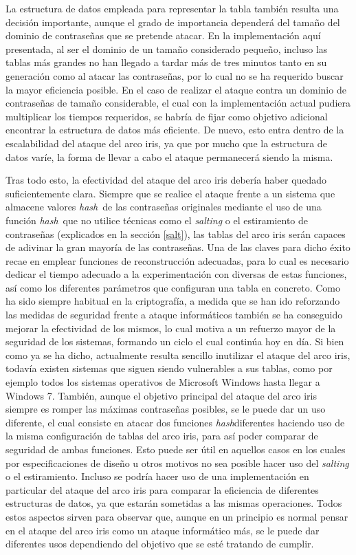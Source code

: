 \documentclass[12pt,spanish,listoffigures,listoftables]{tfgetsinf}
\newcommand{\hash}{\textit{hash}}
\begin{document}
La estructura de datos empleada para representar la tabla también resulta una decisión importante, aunque el grado de importancia dependerá del tamaño del dominio de contraseñas que se pretende atacar. En la implementación aquí presentada, al ser el dominio de un tamaño considerado pequeño, incluso las tablas más grandes no han llegado a tardar más de tres minutos tanto en su generación como al atacar las contraseñas, por lo cual no se ha requerido buscar la mayor eficiencia posible. En el caso de realizar el ataque contra un dominio de contraseñas de tamaño considerable, el cual con la implementación actual pudiera multiplicar los tiempos requeridos, se habría de fijar como objetivo adicional encontrar la estructura de datos más eficiente. De nuevo, esto entra dentro de la escalabilidad del ataque del arco iris, ya que por mucho que la estructura de datos varíe, la forma de llevar a cabo el ataque permanecerá siendo la misma.

Tras todo esto, la efectividad del ataque del arco iris debería haber quedado suficientemente clara. Siempre que se realice el ataque frente a un sistema que almacene valores \hash~de las contraseñas originales mediante el uso de una función \hash~que no utilice técnicas como el \textit{salting} o el estiramiento de contraseñas (explicados en la sección \ref{salt}), las tablas del arco iris serán capaces de adivinar la gran mayoría de las contraseñas. Una de las claves para dicho éxito recae en emplear funciones de reconstrucción adecuadas, para lo cual es necesario dedicar el tiempo adecuado a la experimentación con diversas de estas funciones, así como los diferentes parámetros que configuran una tabla en concreto. Como ha sido siempre habitual en la criptografía, a medida que se han ido reforzando las medidas de seguridad frente a ataque informáticos también se ha conseguido mejorar la efectividad de los mismos, lo cual motiva a un refuerzo mayor de la seguridad de los sistemas, formando un ciclo el cual continúa hoy en día. Si bien como ya se ha dicho, actualmente resulta sencillo inutilizar el ataque del arco iris, todavía existen sistemas que siguen siendo vulnerables a sus tablas, como por ejemplo todos los sistemas operativos de Microsoft Windows hasta llegar a Windows 7. También, aunque el objetivo principal del ataque del arco iris siempre es romper las máximas contraseñas posibles, se le puede dar un uso diferente, el cual consiste en atacar dos funciones \hash diferentes haciendo uso de la misma configuración de tablas del arco iris, para así poder comparar de seguridad de ambas funciones. Esto puede ser útil en aquellos casos en los cuales por especificaciones de diseño u otros motivos no sea posible hacer uso del \textit{salting} o el estiramiento. Incluso se podría hacer uso de una implementación en particular del ataque del arco iris para comparar la eficiencia de diferentes estructuras de datos, ya que estarán sometidas a las mismas operaciones. Todos estos aspectos sirven para observar que, aunque en un principio es normal pensar en el ataque del arco iris como un ataque informático más, se le puede dar diferentes usos dependiendo del objetivo que se esté tratando de cumplir.
\end{document}
